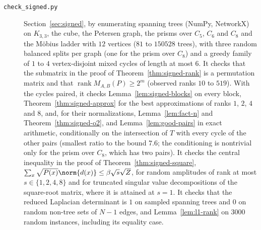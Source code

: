 \begin{description}
\item[\texttt{check\_signed.py}] Section~\ref{sec:signed}, by enumerating spanning trees (NumPy, NetworkX) on $K_{3,3}$, the cube, the Petersen graph, the prisms over $C_5$, $C_6$ and $C_8$ and the M\"obius ladder with $12$ vertices ($81$ to $150528$ trees), with three random balanced splits per graph (one for the prism over $C_8$) and a greedy family of $1$ to $4$ vertex-disjoint mixed cycles of length at most $6$. It checks that the submatrix in the proof of Theorem~\ref{thm:signed-rank} is a permutation matrix and that $\operatorname{rank}M_{A,B}(P)\ge2^m$ (observed ranks $10$ to $519$). With the cycles paired, it checks Lemma~\ref{lem:signed-blocks} on every block, Theorem~\ref{thm:signed-approx} for the best approximations of ranks $1$, $2$, $4$ and $8$, and, for their normalizations, Lemma~\ref{lem:fact-n} and Theorem~\ref{thm:signed-o2}, and Lemma~\ref{lem:good-pairs} in exact arithmetic, conditionally on the intersection of $T$ with every cycle of the other pairs (smallest ratio to the bound $7.6$; the conditioning is nontrivial only for the prism over $C_8$, which has two pairs). It checks the central inequality in the proof of Theorem~\ref{thm:signed-square}, $\sum_x\sqrt{P(x)}\norm{d(x)}\le\beta\sqrt s\sqrt Z$, for random amplitudes of rank at most $s\in\{1,2,4,8\}$ and for truncated singular value decompositions of the square-root matrix, where it is attained at $s=1$. It checks that the reduced Laplacian determinant is $1$ on sampled spanning trees and $0$ on random non-tree sets of $N-1$ edges, and Lemma~\ref{lem:l1-rank} on $3000$ random instances, including its equality case.


\end{description}
